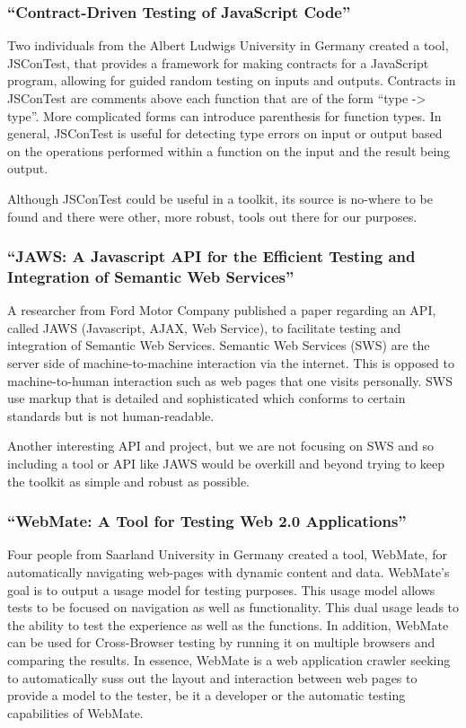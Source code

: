 \documentclass[11pt]{article}
\begin{document}
\subsubsection{``Contract-Driven Testing of JavaScript Code'' \cite{ContractDrivenTesting}}
Two individuals from the Albert Ludwigs University in Germany created a tool, JSConTest, that provides a framework for making contracts for a JavaScript program, allowing for guided random testing on inputs and outputs. Contracts in JSConTest are comments above each function that are of the form ``type -> type''. More complicated forms can introduce parenthesis for function types. In general, JSConTest is useful for detecting type errors on input or output based on the operations performed within a function on the input and the result being output. 

Although JSConTest could be useful in a toolkit, its source is no-where to be found and there were other, more robust, tools out there for our purposes.

\subsubsection{``JAWS: A Javascript API for the Efficient Testing and Integration of Semantic Web Services'' \cite{JAWS}}
A researcher from Ford Motor Company published a paper regarding an API, called JAWS (Javascript, AJAX, Web Service), to facilitate testing and integration of Semantic Web Services. Semantic Web Services (SWS) are the server side of machine-to-machine interaction via the internet. This is opposed to machine-to-human interaction such as web pages that one visits personally. SWS use markup that is detailed and sophisticated which conforms to certain standards but is not human-readable.

Another interesting API and project, but we are not focusing on SWS and so including a tool or API like JAWS would be overkill and beyond trying to keep the toolkit as simple and robust as possible.

\subsubsection{``WebMate: A Tool for Testing Web 2.0 Applications'' \cite{WebMate}}
Four people from Saarland University in Germany created a tool, WebMate, for automatically navigating web-pages with dynamic content and data. WebMate's goal is to output a usage model for testing purposes. This usage model allows tests to be focused on navigation as well as functionality. This dual usage leads to the ability to test the experience as well as the functions. In addition, WebMate can be used for Cross-Browser testing by running it on multiple browsers and comparing the results. In essence, WebMate is a web application crawler seeking to automatically suss out the layout and interaction between web pages to provide a model to the tester, be it a developer or the automatic testing capabilities of WebMate.
\end{document}
